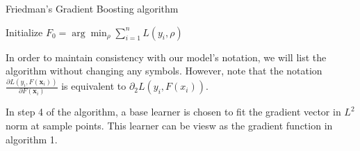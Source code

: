 \begin{center}

\begin{minipage}{0.95\linewidth}
\begin{algorithm}[H]
\SetAlgoLined
\caption{Friedman's Gradient Boosting algorithm}
\KwIn{\begin{itemize}
	\vspace{-0.3cm}
	\item the functinal $L: V \to \R$.
	\vspace{-0.4cm}
	\item number of iterations $M \geq 1$
	\vspace{-0.4cm}
	\item leanring rate $\eta \in (0,1]$
\end{itemize}
}
\vspace{-0.4cm}
Initialize $F_0 =\arg \min _\rho \sum_{i=1}^n L\left(y_i, \rho\right)$ \\
\end{algorithm}
\end{minipage}
\end{center}

In order to maintain consistency with our model's notation, we will list the algorithm without changing any symbols. However, note that the notation $\frac{\partial L\left(y_i, F\left(\mathbf{x}_i\right)\right)}{\partial F\left(\mathbf{x}_i\right)}$ is equivalent to $\partial_2L(y_i, F(x_i))$.

In step 4 of the algorithm, a base learner is chosen to fit the gradient vector in $L^2$ norm at sample points. This learner can be viesw as the gradient function in algorithm 1.


